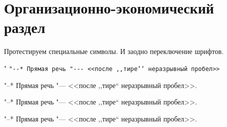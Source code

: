 \chapter{Организационно-экономический раздел}
\label{cha:econom}

Протестируем специальные символы.
И заодно переключение шрифтов.

{\shorthandoff" \texttt{"-{}-* Прямая речь "-{}-{}- <{}<после ,{},тире`{}` неразрывный пробел>{}>}}

{
"--* Прямая речь "--- <<после ,,тире`` неразрывный пробел>>.}

{
"--* Прямая речь "--- <<после ,,тире`` неразрывный пробел>>.}

{
"--* Прямая речь "--- <<после ,,тире`` неразрывный пробел>>.}

